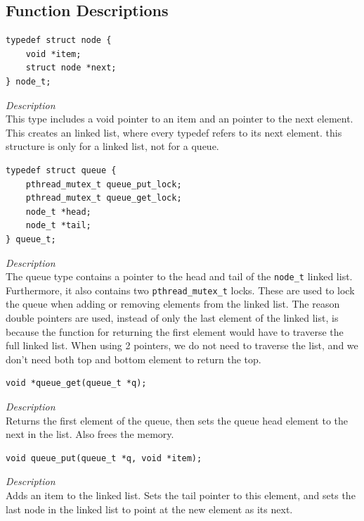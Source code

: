 \documentclass[11pt]{article}
\begin{document}
\subsection{Function Descriptions}


\begin{lstlisting}[style=customc]
typedef struct node {
    void *item;
    struct node *next;
} node_t;
\end{lstlisting}
\textit{Description} \\
This type includes a void pointer to an item and an pointer to the next element.
 This creates an linked list, where every typedef refers to its next element.
 this structure is only for a linked list, not for a queue.



\begin{lstlisting}[style=customc]
typedef struct queue {
    pthread_mutex_t queue_put_lock;
    pthread_mutex_t queue_get_lock;
    node_t *head;
    node_t *tail;
} queue_t;
\end{lstlisting}
\textit{Description} \\
The queue type contains a pointer to the head and tail of the \texttt{node\_t} linked list. Furthermore, it also
contains two \texttt{pthread\_mutex\_t} locks. These are used to lock the queue when adding or removing elements
from the linked list. The reason double pointers are used, instead of only the last element of the linked list, is because the function for returning the first element would have to traverse the full linked list.
When using 2 pointers, we do not need to traverse the list, and we don't need both top and bottom element to return the top.




\begin{lstlisting}[style=customc]
void *queue_get(queue_t *q);
\end{lstlisting}
\textit{Description} \\
Returns the first element of the queue, then sets the queue head element to the next in the list.
Also frees the memory.


\begin{lstlisting}[style=customc]
void queue_put(queue_t *q, void *item);
\end{lstlisting}
\textit{Description} \\
Adds an item to the linked list. Sets the tail pointer to this element, and sets the last node in the linked list to point at the new element as its next.
\end{document}
